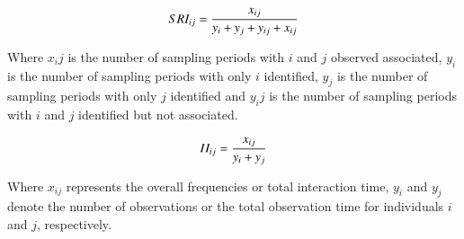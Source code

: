 \documentclass[Afour,sageh,times]{sagej}
\begin{document}
\begin{ceqn}
\begin{align}\label{SRI}
	SRI_{ij} = {x_{ij}\over y_{i}+ y_{j}+ y_{ij}+ x_{ij}}
\end{align}
\end{ceqn}
Where $x_ij$ is the number of sampling periods with $i$ and $j$ observed associated, $y_i$ is the number of sampling periods with only $i$ identified, $y_j$ is the number of sampling periods with only $j$ identified and $y_ij$ is the number of sampling periods with $i$ and $j$ identified but not associated.

\begin{ceqn}
\begin{align}\label{II}
	II_{ij} = {x_{ij} \over y_{i}+ y_{j}}
\end{align}
\end{ceqn}
Where $x_{ij}$ represents the overall frequencies or total interaction time, $y_i$ and $y_j$ denote the number of observations or the total observation time for individuals $i$ and $j$, respectively.\\
\end{document}
